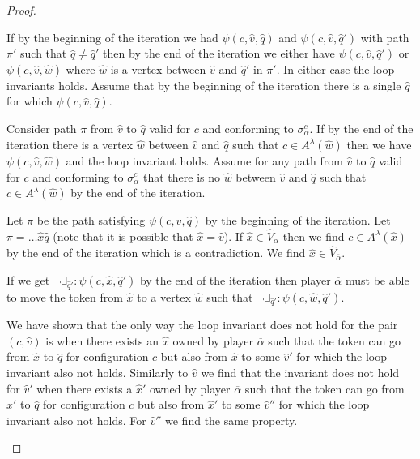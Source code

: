 \begin{theorem}
\begin{proof}
\begin{itemize}[\ \ ]
			If by the beginning of the iteration we had $\psi(c,\hat{v},\hat{q})$ and $\psi(c,\hat{v},\hat{q}')$ with path $\pi'$ such that $\hat{q} \neq \hat{q}'$ then by the end of the iteration we either have $\psi(c,\hat{v},\hat{q}')$ or $\psi(c,\hat{v},\hat{w})$ where $\hat{w}$ is a vertex between $\hat{v}$ and $\hat{q}'$ in $\pi'$. In either case the loop invariants holds. Assume that by the beginning of the iteration there is a single $\hat{q}$ for which $\psi(c,\hat{v},\hat{q})$.
			
			Consider path $\pi$ from $\hat{v}$ to $\hat{q}$ valid for $c$ and conforming to $\sigma_\alpha^c$. If by the end of the iteration there is a vertex $\hat{w}$ between $\hat{v}$ and $\hat{q}$ such that $c \in A^\lambda(\hat{w})$ then we have $\psi(c,\hat{v},\hat{w})$ and the loop invariant holds. Assume for any path from $\hat{v}$ to $\hat{q}$ valid for $c$ and conforming to $\sigma_\alpha^c$ that there is no $\hat{w}$ between $\hat{v}$ and $\hat{q}$ such that $c \in A^\lambda(\hat{w})$ by the end of the iteration.
			
			Let $\pi$ be the path satisfying $\psi(c,\hat{v},\hat{q})$ by the beginning of the iteration. Let $\pi = \dots\hat{x}\hat{q}$ (note that it is possible that $\hat{x} = \hat{v}$). If $\hat{x} \in \hat{V}_\alpha$ then we find $c \in A^\lambda(\hat{x})$ by the end of the iteration which is a contradiction. We find $\hat{x} \in \hat{V}_{\overline{\alpha}}$.
			
			If we get $\neg \exists_{\hat{q}'}: \psi(c,\hat{x},\hat{q}')$ by the end of the iteration then player $\overline{\alpha}$ must be able to move the token from $\hat{x}$ to a vertex $\hat{w}$ such that $\neg \exists_{\hat{q}'}: \psi(c,\hat{w},\hat{q}')$.
			
			We have shown that the only way the loop invariant does not hold for the pair $(c,\hat{v})$ is when there exists an $\hat{x}$ owned by player $\overline{\alpha}$ such that the token can go from  $\hat{x}$ to $\hat{q}$ for configuration $c$ but also from $\hat{x}$ to some $\hat{v}'$ for which the loop invariant also not holds. Similarly to $\hat{v}$ we find that the invariant does not hold for $\hat{v}'$ when there exists a $\hat{x}'$ owned by player $\overline{\alpha}$ such that the token can go from $\hat{x}'$ to $\hat{q}$ for configuration $c$ but also from $\hat{x}'$ to some $\hat{v}''$ for which the loop invariant also not holds. For $\hat{v}''$ we find the same property.
			

\end{itemize}
\end{proof}
\end{theorem}
